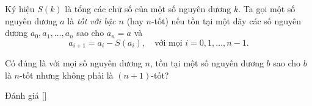 \ifshowproblem
\begin{problem}\label{problem:RUS-2015-MO-10-P4}
    Ký hiệu \( S(k) \) là tổng các chữ số của một số nguyên dương \( k \).  
    Ta gọi một số nguyên dương \( a \) là \textit{tốt với bậc \( n \)} (hay \( n \)-tốt) nếu tồn tại một dãy các số nguyên dương 
    \( a_0, a_1, \ldots, a_n \) sao cho \( a_n = a \) và 
    \[
        a_{i+1} = a_i - S(a_i), \quad \text{với mọi } i = 0, 1, \ldots, n-1.
    \]
    
    Có đúng là với mọi số nguyên dương \( n \), tồn tại một số nguyên dương \( b \) sao cho \( b \) là \( n \)-tốt nhưng không phải là \( (n+1) \)-tốt?
\end{problem}
\fi

\ifshowinfo
Đánh giá [\textbf{}]\footnotemark
{}
\fi